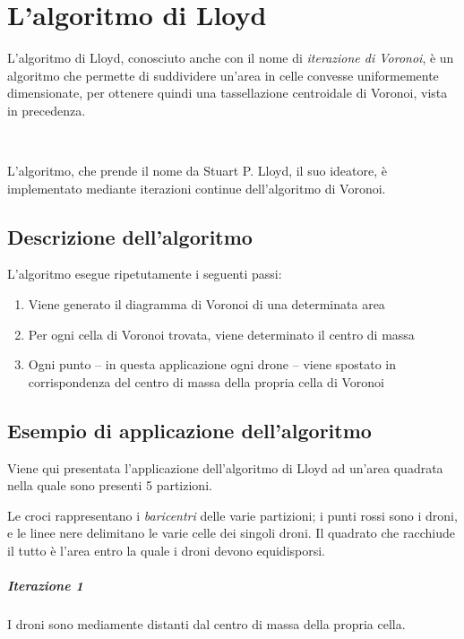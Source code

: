 \documentclass[11pt,a4paper]{report}
\begin{document}
\chapter{L'algoritmo di Lloyd}

L'algoritmo di Lloyd, conosciuto anche con il nome di \textit{iterazione di Voronoi}, è un algoritmo che permette di suddividere un'area in celle convesse uniformemente dimensionate, per ottenere quindi una tassellazione centroidale di Voronoi, vista in precedenza.

\

L'algoritmo, che prende il nome da Stuart P. Lloyd, il suo ideatore, è implementato mediante iterazioni continue dell'algoritmo di Voronoi.

\section{Descrizione dell'algoritmo}

L'algoritmo esegue ripetutamente i seguenti passi:

\begin{enumerate}
	\item Viene generato il diagramma di Voronoi di una determinata area
	\item Per ogni cella di Voronoi trovata, viene determinato il centro di massa
	\item Ogni punto -- in questa applicazione ogni drone -- viene spostato in corrispondenza del centro di massa della propria cella di Voronoi
\end{enumerate}

\section{Esempio di applicazione dell'algoritmo}

Viene qui presentata l'applicazione dell'algoritmo di Lloyd ad un'area quadrata nella quale sono presenti 5 partizioni.

Le croci rappresentano i \textit{baricentri} delle varie partizioni; i punti rossi sono i droni, e le linee nere delimitano le varie celle dei singoli droni. Il quadrato che racchiude il tutto è l'area entro la quale i droni devono equidisporsi.

\paragraph{Iterazione 1}

I droni sono mediamente distanti dal centro di massa della propria cella.
\end{document}
